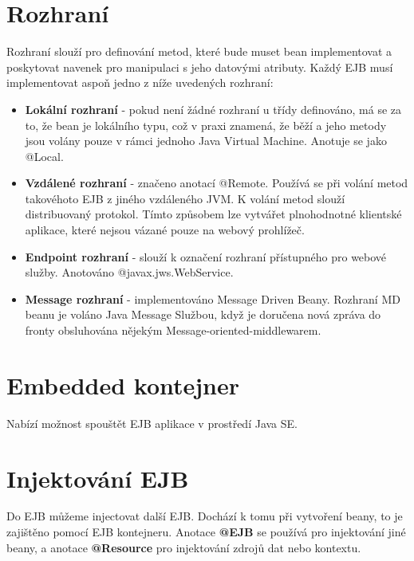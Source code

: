 \documentclass{article}
\begin{document}
\section*{Rozhraní}

Rozhraní slouží pro definování metod, které bude muset bean implementovat a poskytovat navenek pro manipulaci s jeho datovými atributy. Každý EJB musí implementovat aspoň jedno z níže uvedených rozhraní:

\begin{itemize}
\item \textbf{Lokální rozhraní} - pokud není žádné rozhraní u třídy definováno, má se za to, že bean je lokálního typu, což v praxi znamená, že běží a jeho metody jsou volány pouze v rámci jednoho Java Virtual Machine. Anotuje se jako @Local.
\item \textbf{Vzdálené rozhraní} - značeno anotací @Remote. Používá se při volání metod takovéhoto EJB z jiného vzdáleného JVM. K volání metod slouží distribuovaný protokol. Tímto způsobem lze vytvářet plnohodnotné klientské aplikace, které nejsou vázané pouze na webový prohlížeč.
\item \textbf{Endpoint rozhraní} - slouží k označení rozhraní přístupného pro webové služby. Anotováno @javax.jws.WebService.
\item \textbf{Message rozhraní} - implementováno Message Driven Beany. Rozhraní MD beanu je voláno Java Message Službou, když je doručena nová zpráva do fronty obsluhována nějekým Message-oriented-middlewarem.
\end{itemize}

\section*{Embedded kontejner}

Nabízí možnost spouštět EJB aplikace v prostředí Java SE.

\section*{Injektování EJB}

Do EJB můžeme injectovat další EJB. Dochází k tomu při vytvoření beany, to je zajištěno pomocí EJB kontejneru. Anotace \textbf{@EJB} se používá pro injektování jiné beany, a anotace \textbf{@Resource} pro injektování zdrojů dat nebo kontextu.
\end{document}
